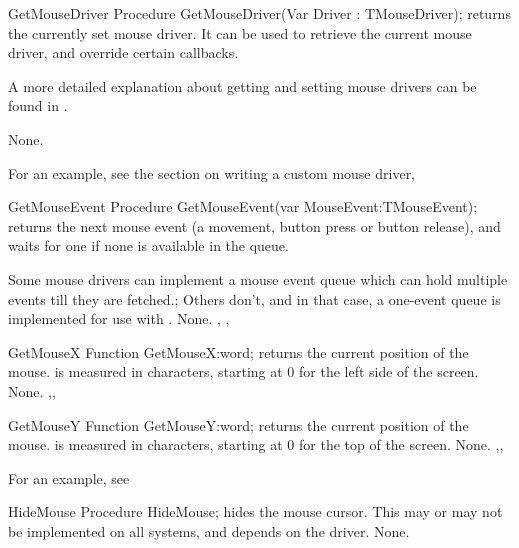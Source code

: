
\begin{procedure}{GetMouseDriver}
\Declaration
Procedure GetMouseDriver(Var Driver : TMouseDriver);
\Description
{} returns the currently set mouse driver. It can be used
to retrieve the current mouse driver, and override certain callbacks.

A more detailed explanation about getting and setting mouse drivers can be found in
.

\Errors
None.
\SeeAlso
{}
\end{procedure}

For an example, see the section on writing a custom mouse driver,

\begin{procedure}{GetMouseEvent}
\Declaration
Procedure GetMouseEvent(var MouseEvent:TMouseEvent);
\Description
{} returns the next mouse event (a movement, button press or
button release), and waits for one if none is available in the queue.

Some mouse drivers can implement a mouse event queue which can hold multiple
events till they are fetched.; Others don't, and in that case, a one-event
queue is implemented for use with .
\Errors
None.
\SeeAlso
{}, , 
\end{procedure}

\begin{function}{GetMouseX}
\Declaration
Function GetMouseX:word;
\Description
{} returns the current  position of the mouse.  is
measured in characters, starting at 0 for the left side of the screen.
\Errors
None.
\SeeAlso
{},, 
\end{function}


\begin{function}{GetMouseY}
\Declaration
Function GetMouseY:word; 
\Description
{} returns the current  position of the mouse.  is
measured in characters, starting at 0 for the top of the screen.
\Errors
None.
\SeeAlso
{},, 
\end{function}

For an example, see 

\begin{procedure}{HideMouse}
\Declaration
Procedure HideMouse;
\Description
{} hides the mouse cursor. This may or may not be implemented
on all systems, and depends on the driver.
\Errors
None.
\SeeAlso
{}
\end{procedure}

